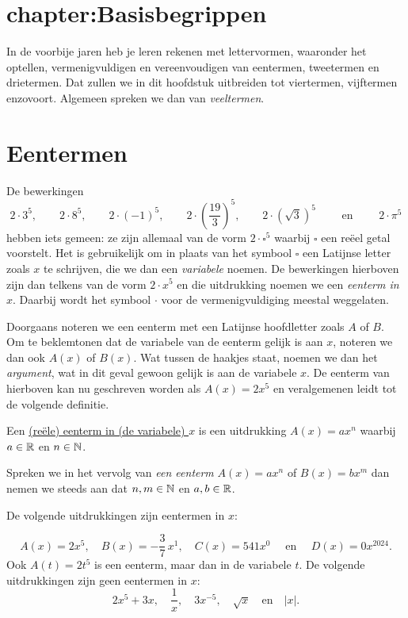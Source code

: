 \documentclass{ximera}
\begin{document}
	\author{Koen de Naeghel - Wiskunde Op Maat}



\section{chapter:Basisbegrippen}

In de voorbije jaren heb je leren rekenen met lettervormen, waaronder het optellen, ver\-menigvuldigen en vereenvoudigen van eentermen, tweetermen en drietermen. Dat zullen we in dit hoofdstuk uitbreiden tot viertermen, vijftermen enzovoort. Algemeen spreken we dan van {\em veeltermen}.

\section{Eentermen}

De bewerkingen
\[
2\cdot 3^5, \qquad 2\cdot 8^5, \qquad 2\cdot (-1)^5, \qquad 2\cdot\left(\frac{19}{3}\right)^5, \qquad 2\cdot\left(\sqrt{3}\right)^5 \qquad \text{ en } \qquad 2 \cdot \pi^5
\]
hebben iets gemeen: ze zijn allemaal van de vorm $2\cdot \square^5$ waarbij $\square$ een re\"eel getal voorstelt. Het is gebruikelijk om in plaats van het symbool $\square$ een Latijnse letter zoals $x$ te schrijven, die we dan een {\em variabele} noemen. De bewerkingen hierboven zijn dan telkens van de vorm $2 \cdot x^5$ en die uitdrukking noemen we een {\em eenterm in $x$}. Daarbij wordt het symbool $\cdot$ voor de vermenigvuldiging meestal weggelaten. 

Doorgaans noteren we een eenterm met een Latijnse hoofdletter zoals $A$ of $B$. Om te beklemtonen dat de variabele van de eenterm gelijk is aan $x$, noteren we dan ook $A(x)$ of $B(x)$. Wat tussen de haakjes staat, noemen we dan het {\em argument}, wat in dit geval gewoon gelijk is aan de variabele $x$. De eenterm van hierboven kan nu geschreven worden als $A(x) = 2x^5$ en veralgemenen leidt tot de volgende definitie.

\begin{definition} 
Een \underline{(re\"ele) eenterm in (de variabele) $x$} is een uitdrukking $A(x) = ax^n$ waarbij $a \in \mathbb{R}$ en $n \in \mathbb{N}$. 
\end{definition} 

Spreken we in het vervolg van {\em een eenterm} $A(x) = ax^n$ of $B(x) = bx^m$ dan nemen we steeds aan dat $n,m\in \mathbb{N}$ en $a,b\in \mathbb{R}$.

\begin{example} 
De volgende uitdrukkingen zijn eentermen in $x$:
	
\[
A(x) = 2x^5, \quad B(x) = -\frac{3}{7}\,x^1, \quad C(x) = 541x^0 \quad \text{ en } \quad D(x) = 0x^{2024}.
\]
Ook $A(t) = 2t^5$ is een eenterm, maar dan in de variabele $t$. De volgende uitdrukkingen zijn geen eentermen in $x$:
\[
2x^5+3x, \quad \frac{1}{x}, \quad 3x^{-5}, \quad \sqrt{x} \quad \text{en} \quad \left|x\right|.
\] 
\end{example} 
\end{document}
